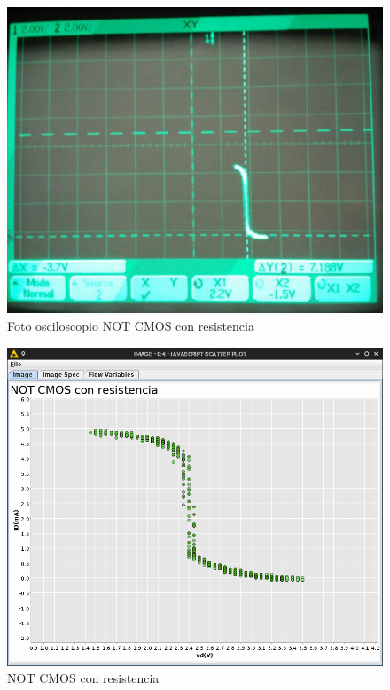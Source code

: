\documentclass[paper=a4, fontsize=11pt]{scrartcl} %
\numberwithin{equation}{section} %
\numberwithin{figure}{section} %
\numberwithin{table}{section} %
\begin{document}
\begin{figure}[H]
	\centering
	\includegraphics[scale=0.4]{image/cmos-res}
	\caption{Foto osciloscopio NOT CMOS con resistencia}
	\label{fig:prac-5a-img3a}
\end{figure}

\begin{figure}[H]
	\centering
	\includegraphics[scale=0.27]{image/NOTp5a}
	\caption{NOT CMOS con resistencia}
	\label{fig:prac-5a-img3}
\end{figure}
\end{document}
